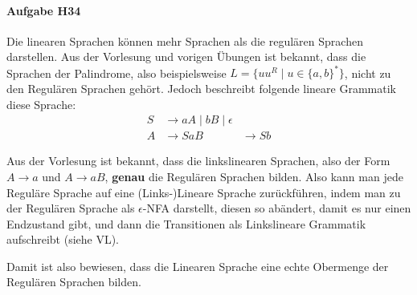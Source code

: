 \documentclass[11pt]{article}
\begin{document}
\paragraph{Aufgabe H34} Die linearen Sprachen können mehr Sprachen als die regulären Sprachen darstellen. Aus der Vorlesung und vorigen Übungen ist bekannt, dass die Sprachen der Palindrome, also beispielsweise $L=\{uu^R \mid u \in\{a,b\}^*\}$, nicht zu den Regulären Sprachen gehört. Jedoch beschreibt folgende lineare Grammatik diese Sprache:
\begin{align*}
S &\rightarrow aA \mid bB \mid \epsilon \\
A &\rightarrow Sa
B &\rightarrow Sb
\end{align*}

Aus der Vorlesung ist bekannt, dass die linkslinearen Sprachen, also der Form $A \rightarrow a$ und $A \rightarrow aB$, \textbf{genau} die Regulären Sprachen bilden. Also kann man jede Reguläre Sprache auf eine (Links-)Lineare Sprache zurückführen, indem man zu der Regulären Sprache als $\epsilon$-NFA darstellt, diesen so abändert, damit es nur einen Endzustand gibt, und dann die Transitionen als Linkslineare Grammatik aufschreibt (siehe VL).

Damit ist also bewiesen, dass die Linearen Sprache eine echte Obermenge der Regulären Sprachen bilden.
\end{document}
